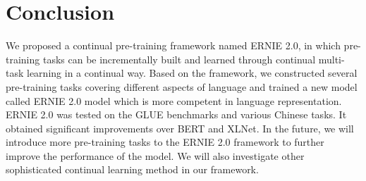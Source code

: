 \documentclass[letterpaper]{article} \usepackage{aaai20}  \usepackage{times}  \usepackage{helvet} \usepackage{courier}  \usepackage[hyphens]{url}  \usepackage{graphicx} \usepackage{makecell}
\begin{document}
\section{Conclusion}
We proposed a continual pre-training framework named ERNIE 2.0, in which pre-training tasks can be incrementally built and learned through continual multi-task learning in a continual way. 
Based on the framework, we constructed several pre-training tasks covering different aspects of language and trained a new model called ERNIE 2.0 model which is more competent in language representation. 
ERNIE 2.0 was tested on the GLUE benchmarks and various Chinese tasks. It obtained significant improvements over BERT and XLNet. In the future, we will introduce more pre-training tasks to the ERNIE 2.0 framework to further improve the performance of the model. We will also investigate other sophisticated continual learning method in our framework.

  
  
\end{document}
